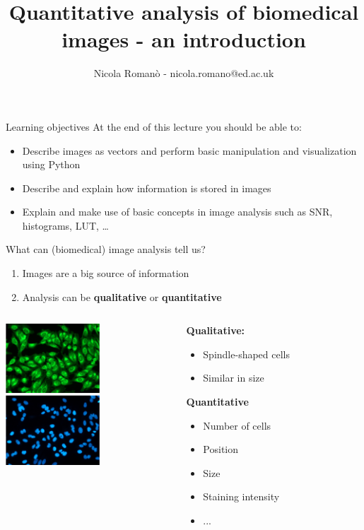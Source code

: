\documentclass[9pt, aspectratio=169]{beamer}
\author{Nicola Roman\`o - nicola.romano@ed.ac.uk}
\title{Quantitative analysis of biomedical images - an introduction}
\date{}
\begin{document}

\begin{frame}
	\titlepage
\end{frame}

\begin{frame}
	{Learning objectives}
	At the end of this lecture you should be able to:
	\begin{itemize}
		\item Describe images as vectors and perform basic manipulation and visualization using Python
		\item Describe and explain how information is stored in images
		\item Explain and make use of basic concepts in image analysis such as SNR, histograms, LUT, \dots
	\end{itemize}
\end{frame}

\begin{frame}
	{What can (biomedical) image analysis tell us?}
	\begin{enumerate}
		\item Images are a big source of information
		\item Analysis can be \textbf{qualitative} or \textbf{quantitative}
	\end{enumerate}
	\pause
	\begin{columns}[T]
		\begin{column}{0.4\textwidth}
			\centering
			\includegraphics[height=150pt]{cells.jpg}
		\end{column}
		\pause
		\begin{column}{0.6\textwidth}
			\textbf{Qualitative:}
			\begin{itemize}
				\item Spindle-shaped cells
				\item Similar in size
			\end{itemize}
			\pause
			\textbf{Quantitative}
			\begin{itemize}
				\item Number of cells
				\item Position
				\item Size
				\item Staining intensity
				\item ...
			\end{itemize}
		\end{column}
	\end{columns}
\end{frame}
\end{document}
